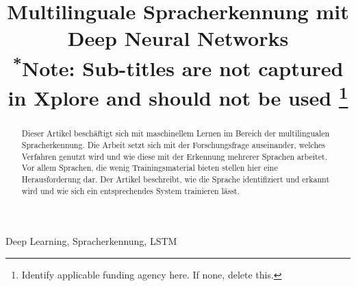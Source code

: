 \documentclass[conference]{IEEEtran}
\begin{document}
	
	\title{Multilinguale Spracherkennung mit Deep Neural
		Networks\\
		{\footnotesize \textsuperscript{*}Note: Sub-titles are not captured in Xplore and
			should not be used}
		\thanks{Identify applicable funding agency here. If none, delete this.}
	}
	
	\author{
		\and
		\and
	}
	
	\maketitle
	
	\begin{abstract}
	Dieser Artikel beschäftigt sich mit maschinellem Lernen im Bereich der multilingualen Spracherkennung. Die Arbeit setzt sich mit der Forschungsfrage auseinander, welches Verfahren genutzt wird und wie diese mit der Erkennung mehrerer Sprachen arbeitet. Vor allem Sprachen, die wenig Trainingsmaterial bieten stellen hier eine Herausforderung dar. Der Artikel beschreibt, wie die Sprache identifiziert und erkannt wird und wie sich ein entsprechendes System trainieren lässt. 
	\end{abstract}
	
	\begin{IEEEkeywords}
		Deep Learning, Spracherkennung, LSTM
	\end{IEEEkeywords}
	

	
	
	
	
	
	
	
	
	
	
	
\end{document}
